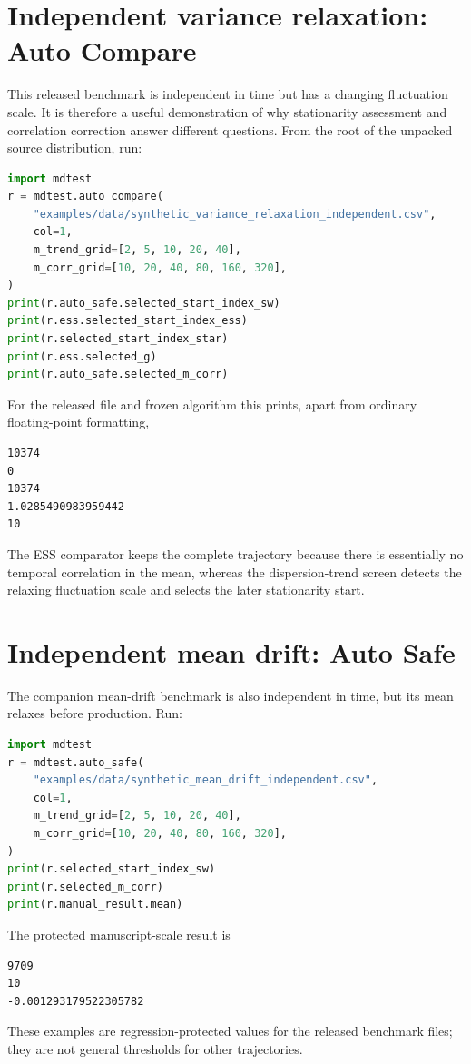 \documentclass[11pt,oneside]{report}
\begin{document}
\section{Independent variance relaxation: Auto Compare}
This released benchmark is independent in time but has a changing fluctuation scale.  It is therefore a useful demonstration of why stationarity assessment and correlation correction answer different questions.  From the root of the unpacked source distribution, run:
\begin{lstlisting}[language=Python]
import mdtest
r = mdtest.auto_compare(
    "examples/data/synthetic_variance_relaxation_independent.csv",
    col=1,
    m_trend_grid=[2, 5, 10, 20, 40],
    m_corr_grid=[10, 20, 40, 80, 160, 320],
)
print(r.auto_safe.selected_start_index_sw)
print(r.ess.selected_start_index_ess)
print(r.selected_start_index_star)
print(r.ess.selected_g)
print(r.auto_safe.selected_m_corr)
\end{lstlisting}
For the released file and frozen algorithm this prints, apart from ordinary floating-point formatting,
\begin{lstlisting}
10374
0
10374
1.0285490983959442
10
\end{lstlisting}
The ESS comparator keeps the complete trajectory because there is essentially no temporal correlation in the mean, whereas the dispersion-trend screen detects the relaxing fluctuation scale and selects the later stationarity start.

\section{Independent mean drift: Auto Safe}
The companion mean-drift benchmark is also independent in time, but its mean relaxes before production.  Run:
\begin{lstlisting}[language=Python]
import mdtest
r = mdtest.auto_safe(
    "examples/data/synthetic_mean_drift_independent.csv",
    col=1,
    m_trend_grid=[2, 5, 10, 20, 40],
    m_corr_grid=[10, 20, 40, 80, 160, 320],
)
print(r.selected_start_index_sw)
print(r.selected_m_corr)
print(r.manual_result.mean)
\end{lstlisting}
The protected manuscript-scale result is
\begin{lstlisting}
9709
10
-0.001293179522305782
\end{lstlisting}
These examples are regression-protected values for the released benchmark files; they are not general thresholds for other trajectories.
\end{document}

